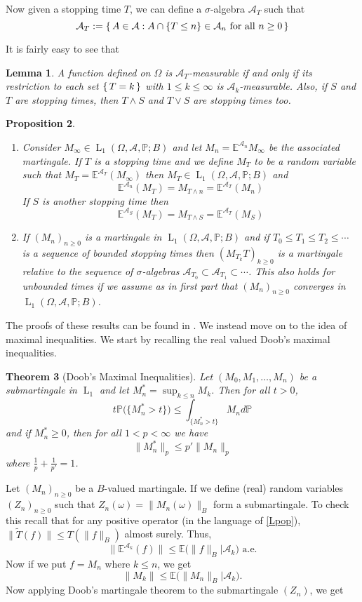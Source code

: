 \documentclass[]{report}
\newcommand{\lp}[2]{\operatorname{L}_{#1}({#2})}
\newcommand*{\Normb}[2]{\lVert {#1} \rVert_{#2}}
\newcommand*{\Normu}[1]{\lVert {#1} \rVert}
\newcommand*{\ext}[1]{\mathbb{E}\big({#1}\big)}
\renewcommand{\P}[1]{\mathbb{P}\big({#1}\big)}
\newcommand{\pspc}{\Omega,\mathcal{A},\mathbb{P}}
\newcommand*{\extop}[1]{\mathbb{E}^{{#1}}}
\newtheorem{theorem}{Theorem}[chapter]
\newtheorem{lemma}[theorem]{Lemma}
\newtheorem{prop}[theorem]{Proposition}
\begin{document}
Now given a stopping time $T$, we can define a $\sigma$-algebra $\mathcal{A}_T$ such that 
\[ \mathcal{A}_T := \set{A\in \mathcal{A} : A \cap\{T\leq n\}\in \mathcal{A}_n \text{ for all }n\geq 0 } \]

It is fairly easy to see that 
\begin{lemma}
	A function defined on $\Omega$ is $\mathcal{A}_T$-measurable if and only if its restriction to each set $\set{T=k}$ with $1\leq k \leq \infty$ is $\mathcal{A}_k$-measurable. Also, if $S$ and $T$ are stopping times, then $T\wedge S$ and $T\vee S$ are stopping times too.
\end{lemma}

\begin{prop}
	\begin{enumerate}
		\item Consider $M_{\infty} \in \lp{1}{\pspc;B}$ and let $M_n=\extop{\mathcal{A}_n}M_{\infty}$ be the associated martingale. If $T$ is a stopping time and we define $M_T$ to be a random variable such that $M_T = \extop{\mathcal{A}_T}(M_{\infty})$ then $M_T \in \lp{1}{\pspc;B}$ and \[ \extop{\mathcal{A}_n}(M_T)= M_{T\wedge n}= \extop{\mathcal{A}_T}(M_n) \]
		If $S$ is another  stopping time then 
		 \[ \extop{\mathcal{A}_S}(M_T)= M_{T\wedge S}= \extop{\mathcal{A}_T}(M_S) \]
		 \item If $(M_n)_{n\geq 0}$ is a martingale in $\lp{1}{\pspc;B}$ and if $T_0\leq T_1 \leq T_2 \leq \cdots$ is a sequence of \textit{bounded} stopping times then $(M_{T_k}T)_{k\geq 0}$ is a martingale relative to the sequence of $\sigma$-algebras $\mathcal{A}_{T_0} \subset \mathcal{A}_{T_1} \subset \cdots$. This also holds for unbounded times if we assume as in first part that $(M_n)_{n\geq 0}$ converges in $\lp{1}{\pspc;B}$.
	\end{enumerate}
\end{prop}
The proofs of these results can be found in \cite{pis}. We instead move on to the idea of maximal inequalities. We start by recalling the real valued Doob's maximal inequalities.
\begin{theorem}[Doob's Maximal Inequalities]
	Let $(M_0,M_1,\ldots,M_n)$ be a submartingale in $\operatorname{L}_1$ and let $M_n^*=\sup_{k\leq n}M_k$. Then for all $t>0$,
	\[ t\P{\{M_n^* >t\}} \leq \int_{\{M_n^*>t\}}M_nd\mathbb{P} \]
	and if $M_n^*\geq 0$, then for all $1 < p <\infty$ we have 
	\[ \Normb{M_n^*}{p} \leq p'\Normb{M_n}{p} \] where $\frac{1}{p}+\frac{1}{p'}=1$.
\end{theorem}

Let $(M_n)_{n\geq 0}$ be a $B$-valued martingale. If we define (real) random variables $(Z_n)_{n\geq0}$ such that $Z_n(\omega)=\Normb{M_n(\omega)}{B}$ form a submartingale. To check this recall that for any positive operator (in the language of \ref{Lpop}), $ \Normu{\tilde{T}(f)} \leq T(\Normb{f}{B})$ almost surely. Thus,
\[ \Normu{\extop{\mathcal{A}_k}(f)} \leq \ext{\Normb{f}{B}|\mathcal{A}_k} \text{ a.e.} \]
Now if we put $f=M_n$ where $k\leq n$, we get
\[ \Normu{M_k} \leq \ext{\Normb{M_n}{B}|\mathcal{A}_k}. \] 
Now applying Doob's martingale theorem to the submartingale $(Z_n)$, we get 
\end{document}

